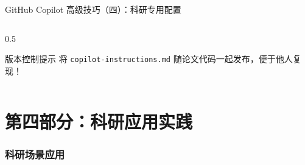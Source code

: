 \documentclass[aspectratio=169,11pt]{beamer}
\begin{document}
\begin{frame}[fragile]{GitHub Copilot 高级技巧（四）：科研专用配置}
\begin{columns}
\begin{column}{0.5\textwidth}
            \vspace{0.2cm}
            \begin{alertblock}{版本控制提示}
                \small
                将 \texttt{copilot-instructions.md} 随论文代码一起发布，便于他人复现！
            \end{alertblock}
        \end{column}
    \end{columns}
\end{frame}

\part{第四部分：科研应用实践}

\section{科研场景应用}
\end{document}
